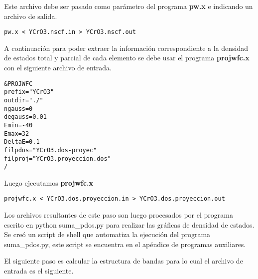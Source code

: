 \noindent Este archivo debe ser pasado como par\'ametro del programa \textbf{pw.x} e indicando un archivo de salida.

\begin{lstlisting}
pw.x < YCrO3.nscf.in > YCrO3.nscf.out
\end{lstlisting}

\noindent A continuaci\'on para poder extraer la informaci\'on correspondiente a la densidad de estados total y parcial de cada elemento se debe usar el programa \textbf{projwfc.x} con el siguiente archivo de entrada.

\begin{lstlisting}
&PROJWFC
prefix="YCrO3"
outdir="./"
ngauss=0
degauss=0.01
Emin=-40
Emax=32
DeltaE=0.1
filpdos="YCrO3.dos-proyec"
filproj="YCrO3.proyeccion.dos"
/
\end{lstlisting}

\noindent Luego ejecutamos \textbf{projwfc.x}

\begin{lstlisting}
projwfc.x < YCrO3.dos.proyeccion.in > YCrO3.dos.proyeccion.out
\end{lstlisting}

\noindent Los archivos resultantes de este paso son luego procesados por el programa escrito en python suma\_pdos.py para realizar las gr\'aficas de densidad de estados. Se cre\'o un script de shell que automatiza la ejecuci\'on del programa suma\_pdos.py, este script se encuentra en el ap\'endice de programas auxiliares.

\noindent El siguiente paso es calcular la estructura de bandas para lo cual el archivo de entrada es el siguiente.

